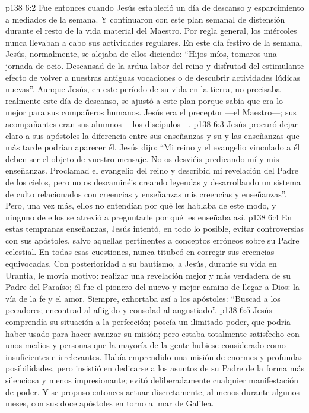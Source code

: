 \vs p138 6:2 Fue entonces cuando Jesús estableció un día de descanso y esparcimiento a mediados de la semana. Y continuaron con este plan semanal de distensión durante el resto de la vida material del Maestro. Por regla general, los miércoles nunca llevaban a cabo sus actividades regulares. En este día festivo de la semana, Jesús, normalmente, se alejaba de ellos diciendo: “Hijos míos, tomaros una jornada de ocio. Descansad de la ardua labor del reino y disfrutad del estimulante efecto de volver a nuestras antiguas vocaciones o de descubrir actividades lúdicas nuevas”. Aunque Jesús, en este período de su vida en la tierra, no precisaba realmente este día de descanso, se ajustó a este plan porque sabía que era lo mejor para sus compañeros humanos. Jesús era el preceptor ---el Maestro---; sus acompañantes eran sus alumnos ---los discípulos---.
\vs p138 6:3 \pc Jesús procuró dejar claro a sus apóstoles la diferencia entre sus enseñanzas y su  y las enseñanzas que más tarde podrían aparecer  él. Jesús dijo: “Mi reino y el evangelio vinculado a él deben ser el objeto de vuestro mensaje. No os desviéis predicando  mí y  mis enseñanzas. Proclamad el evangelio del reino y describid mi revelación del Padre de los cielos, pero no os descaminéis creando leyendas y desarrollando un sistema de culto relacionados con creencias y enseñanzas  mis creencias y enseñanzas”. Pero, una vez más, ellos no entendían por qué les hablaba de este modo, y ninguno de ellos se atrevió a preguntarle por qué les enseñaba así.
\vs p138 6:4 En estas tempranas enseñanzas, Jesús intentó, en todo lo posible, evitar controversias con sus apóstoles, salvo aquellas pertinentes a conceptos erróneos sobre su Padre celestial. En todas esas cuestiones, nunca titubeó en corregir sus creencias equivocadas. Con posterioridad a su bautismo, a Jesús, durante su vida en Urantia, le movía  motivo: realizar una revelación mejor y más verdadera de su Padre del Paraíso; él fue el pionero del nuevo y mejor camino de llegar a Dios: la vía de la fe y el amor. Siempre, exhortaba así a los apóstoles: “Buscad a los pecadores; encontrad al afligido y consolad al angustiado”.
\vs p138 6:5 Jesús comprendía su situación a la perfección; poseía un ilimitado poder, que podría haber usado para hacer avanzar su misión; pero estaba totalmente satisfecho con unos medios y personas que la mayoría de la gente hubiese considerado como insuficientes e irrelevantes. Había emprendido una misión de enormes y profundas posibilidades, pero insistió en dedicarse a los asuntos de su Padre de la forma más silenciosa y menos impresionante; evitó deliberadamente cualquier manifestación de poder. Y se propuso entonces actuar discretamente, al menos durante algunos meses, con sus doce apóstoles en torno al mar de Galilea.
